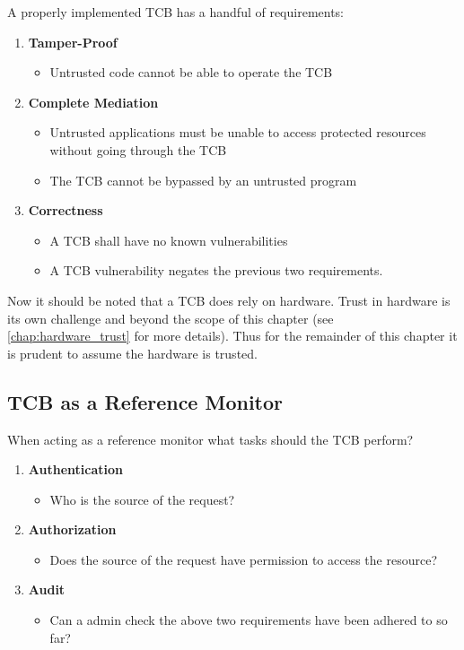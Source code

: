     A properly implemented TCB has a handful of requirements:
    \begin{enumerate}
      \item \textbf{Tamper-Proof}
      \begin{itemize}
        \item Untrusted code cannot be able to operate the TCB
      \end{itemize}
      \item \textbf{Complete Mediation}
      \begin{itemize}
        \item Untrusted applications must be unable to access protected resources without going through the TCB
        \item The TCB cannot be bypassed by an untrusted program
      \end{itemize}
      \item \textbf{Correctness}
      \begin{itemize}
        \item A TCB shall have no known vulnerabilities
        \item A TCB vulnerability negates the previous two requirements.
      \end{itemize}
    \end{enumerate}

    Now it should be noted that a TCB does rely on hardware.
    Trust in hardware is its own challenge and beyond the scope of this chapter (see \autoref{chap:hardware_trust} for more details).
    Thus for the remainder of this chapter it is prudent to assume the hardware is trusted.

    \cite{cs6238_Ahamad}

  \subsection{TCB as a Reference Monitor}
  \label{ssec:tcb_as_ref_monitor}

    When acting as a reference monitor what tasks should the TCB perform?

    \begin{enumerate}
      \item \textbf{Authentication}
      \begin{itemize}
        \item Who is the source of the request?
      \end{itemize}
      \item \textbf{Authorization}
      \begin{itemize}
        \item Does the source of the request have permission to access the resource?
      \end{itemize}
      \item \textbf{Audit}
      \begin{itemize}
        \item Can a admin check the above two requirements have been adhered to so far?
      \end{itemize}
    \end{enumerate}


